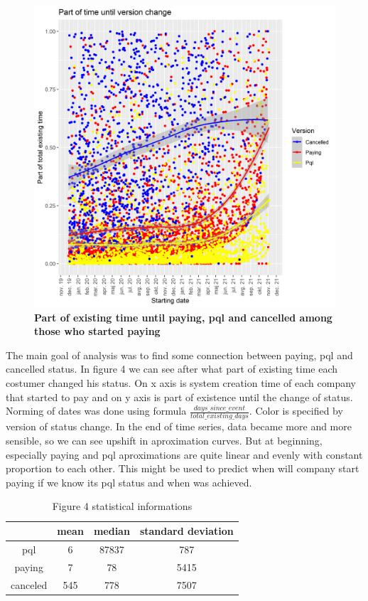 \documentclass[fleqn,moreauthors,10pt]{ds_report}
\begin{document}
\begin{figure}\centering
	\includegraphics[width=\linewidth]{activity_after_days.png}
	\caption{\textbf{Part of existing time until paying, pql and cancelled among those who started paying} }
	\label{fig:main}
\end{figure}
The main goal of analysis was to find some connection between paying, pql and cancelled status. In figure 4 we can see after what part of existing time each costumer changed his status. On x axis is system creation time of each company that started to pay and on y axis is part of existence until the change of status. Norming of dates was done using formula $\frac{days\_since\_event}{total\_existing\_days}$. Color is specified by version of status change. In the end of time series, data became more and more sensible, so we can see upshift in aproximation curves. But at beginning, especially paying and pql aproximations are quite linear and evenly with constant proportion to each other. This might be used to predict when will company start paying if we know its pql status and when was achieved. 
\begin{center}

\begin{table}
\caption{Figure 4 statistical informations}

\begin{tabular}{|c |c c c||} 
 \hline
  & mean & median & standard deviation \\ [0.5ex] 
 \hline\hline
 pql & 6 & 87837 & 787 \\ 
 \hline
 paying & 7 & 78 & 5415 \\
 \hline
 canceled & 545 & 778 & 7507 \\
 \hline
 
\end{tabular}

\end{table}

\end{center}
\end{document}

